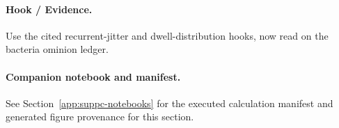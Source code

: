 \FloatBarrier

\paragraph{Hook / Evidence.} Use the cited recurrent-jitter and dwell-distribution hooks, now read on the bacteria ominion ledger.

\paragraph{Companion notebook and manifest.} See Section~\ref{app:suppc-notebooks} for the executed calculation manifest and generated figure provenance for this section.

\begin{quote}\small{}\end{quote}
